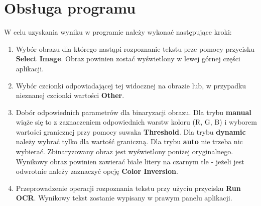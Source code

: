\section{Obsługa programu}
	W celu uzyskania wyniku w programie należy wykonać następujące kroki:
	\begin{enumerate}
		\item Wybór obrazu dla którego nastąpi rozpoznanie tekstu prze pomocy przycisku \textbf{Select Image}. Obraz powinien zostać wyświetlony w lewej górnej części aplikacji.
		\item Wybór czcionki odpowiadającej tej widocznej na obrazie lub, w przypadku nieznanej czcionki wartości \textbf{Other}.
		\item Dobór odpowiednich parametrów dla binaryzacji obrazu. 
			Dla trybu \textbf{manual} wiąże się to z zaznaczeniem odpowiednich warstw koloru (R, G, B) i wyborem wartości granicznej przy pomocy suwaka \textbf{Threshold}.
			Dla trybu \textbf{dynamic} należy wybrać tylko dla wartość graniczną.
			Dla trybu \textbf{auto} nie trzeba nic wybierać.			
			Zbinaryzowany obraz jest wyświetlony poniżej oryginalnego.			
			Wynikowy obraz powinien zawierać białe litery na czarnym tle - jeżeli jest odwrotnie należy zaznaczyć opcję \textbf{Color Inversion}.
		\item Przeprowadzenie operacji rozpoznania tekstu przy użyciu przycisku \textbf{Run OCR}. Wynikowy tekst zostanie wypisany w prawym panelu aplikacji.
	\end{enumerate}